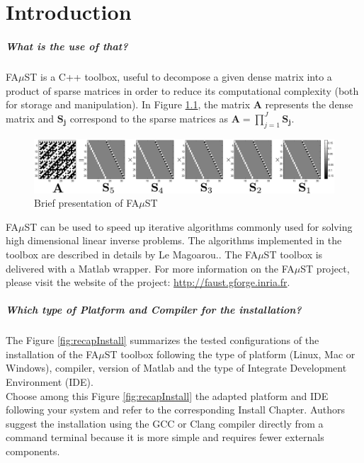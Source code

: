 \chapter{Introduction}\label{sec:intro}

\paragraph{What is the use of that?}FA$\mu$ST is a C++ toolbox, useful to decompose a given dense matrix into a product of sparse matrices in order to reduce its computational complexity (both for storage and manipulation). In Figure \ref{fig:presentation}, the matrix \textbf{A} represents the dense matrix and $\mathbf{S_j}$ correspond to the sparse matrices as $\mathbf{A}=\prod_{j=1}^J\mathbf{S_j}$.

\begin{figure}[H] %
\centering
\includegraphics[scale=0.5]{images/hadamard32_bw.pdf}
\caption{Brief presentation of FA$\mu$ST}
\label{fig:presentation}
\end{figure}

FA$\mu$ST can be used to speed up iterative algorithms commonly used for solving high dimensional linear inverse problems. The algorithms implemented in the toolbox are described in details by Le Magoarou.\cite{LeMagoarou2016}.
The FA$\mu$ST toolbox is delivered with a Matlab wrapper. 
For more information on the FA$\mu$ST project, please visit the website of the project: \url{http://faust.gforge.inria.fr}.


\paragraph{Which type of Platform and Compiler for the installation?} 
The Figure \ref{fig:recapInstall} summarizes the tested configurations of the installation of the FA$\mu$ST toolbox following the type of platform (Linux, Mac or Windows), compiler, version of Matlab and the type of Integrate Development Environment (IDE).\\
Choose among this Figure \ref{fig:recapInstall} the adapted platform and IDE following your system and refer to the corresponding Install Chapter. Authors suggest the installation using the GCC or Clang compiler directly from a command terminal because it is more simple and requires fewer externals components. 

